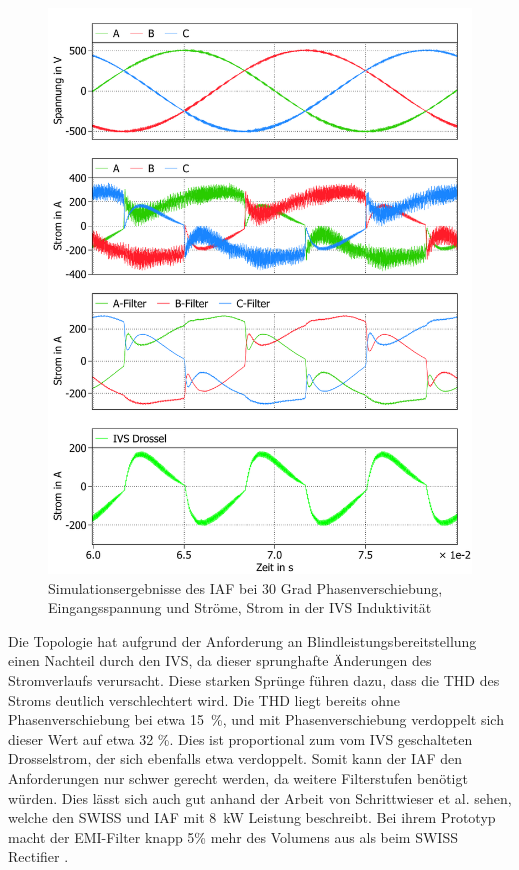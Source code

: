 \begin{figure}
	\centering
	\includegraphics[width=1\linewidth]{content/Grafiken/IAF_AC+L_30Grad}
	\caption{Simulationsergebnisse des IAF bei 30 Grad Phasenverschiebung, Eingangsspannung und Ströme, Strom in der IVS Induktivität }
	\label{fig:iafacl30grad}
\end{figure}
Die Topologie hat aufgrund der Anforderung an Blindleistungsbereitstellung einen Nachteil durch den IVS, da dieser sprunghafte Änderungen des Stromverlaufs verursacht. Diese starken Sprünge führen dazu, dass die THD des Stroms deutlich verschlechtert wird. Die THD liegt bereits ohne Phasenverschiebung bei etwa 15~\%, und mit Phasenverschiebung verdoppelt sich dieser Wert auf etwa 32 \%. Dies ist proportional zum vom \gls{IVS} geschalteten Drosselstrom, der sich ebenfalls etwa verdoppelt.  Somit kann der IAF den Anforderungen nur schwer gerecht werden, da weitere Filterstufen benötigt würden. Dies lässt sich auch gut anhand der Arbeit von Schrittwieser et al. sehen, welche den SWISS und \gls{IAF} mit 8~kW Leistung beschreibt. Bei ihrem Prototyp macht der EMI-Filter knapp 5\% mehr des Volumens aus als beim SWISS Rectifier \cite{IAF99}.

